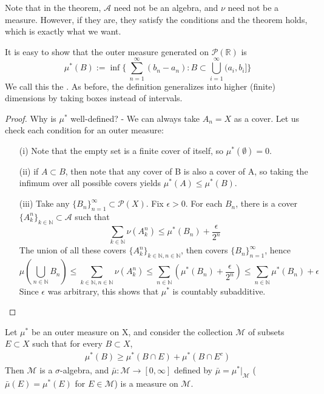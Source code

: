 \documentclass[11pt]{scrartcl}
\begin{document}
\begin{remark}
Note that in the theorem, $\mathcal{A}$ need not be an algebra, and $\nu$ need not be a measure. However, if they are, they satisfy the conditions and the theorem holds, which is exactly what we want.
\end{remark}


\begin{example}
It is easy to show that the outer measure generated on $\mathcal{P}(\mathbb{R})$ is 
$$\mu^*(B) := 
\inf \{\ \sum_{n=1}^\infty (b_n - a_n) :  B \subset  \bigcup_{i=1}^\infty (a_i,b_i]  \}$$
We call this the . As before, the definition generalizes into higher (finite) dimensions by taking boxes instead of intervals.
\end{example}


\begin{proof}
Why is $\mu^*$ well-defined? - We can always take $A_n = X$ as a cover.
Let us check each condition for an outer measure:
\begin{itemize}
\item[(i)] Note that the empty set is a finite cover of itself, so $\mu^*(\emptyset) = 0$.
\item[(ii)] if $ A \subset B$, then note that any cover of B is also a cover of A, so taking the infimum over all possible covers yields $\mu^*(A)\leq \mu^*(B)$.
\item[(iii)] Take any $\{B_n\}_{n=1}^\infty \subset \mathcal{P}(X)$. Fix $\epsilon >0$. For each $B_n$, there is a cover  $\{A_{k}^n\}_{k\in \mathbb{N}}\subset \mathcal{A}$ such that 
$$\sum_{k \in \mathbb{N}} \nu(A_k^n) \leq \mu^*(B_n) + \frac{\epsilon}{2^n}$$
The union of all these covers $\{A_{k}^n\}_{k\in \mathbb{N},n\in \mathbb{N}}$, then covers $\{B_n\}_{n=1}^\infty$, hence 
$$\mu(\bigcup_{n\in \mathbb{N}} B_n ) \leq \sum_{k \in \mathbb{N},n \in \mathbb{N}} \nu(A_k^n) \leq \sum_{n \in \mathbb{N}} (\mu^*(B_n) + \frac{\epsilon}{2^n})
\leq \sum_{n \in \mathbb{N}} \mu^*(B_n) + \epsilon $$
Since $\epsilon$ was arbitrary, this shows that $\mu^*$ is countably subadditive.
\end{itemize}

\end{proof}



\begin{theorem}
Let $\mu^*$ be an outer measure on X, and consider the collection $\mathcal{M}$ of subsets $E \subset X$ such that for every $B \subset X$,
\begin{align}
\mu^*(B) \geq \mu^*(B\cap E) + \mu^*(B \cap E^c)\tag{*}
\end{align}
Then $\mathcal{M}$ is a $\sigma$-algebra, and $\bar{\mu}: \mathcal{M} \rightarrow [0,\infty]$ defined by $\bar{\mu} = \mu^*|_\mathcal{M}$ ($\bar{\mu}(E) = \mu^*(E)$ for $E\in \mathcal{M}$) is a measure on $\mathcal{M}$.
\end{theorem}
\end{document}
